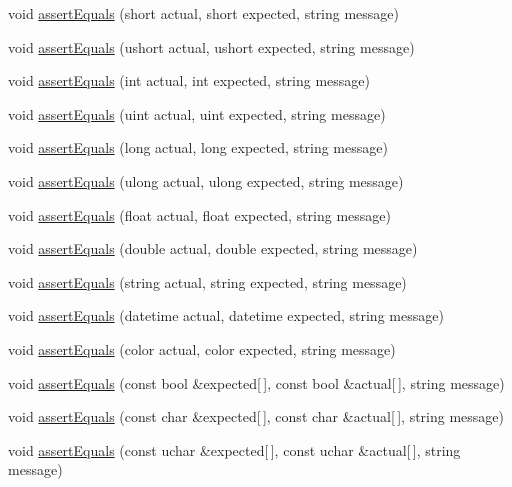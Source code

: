 \begin{DoxyCompactItemize}
void \mbox{\hyperlink{class_unit_test_a005a358493b8c45e8aca3e771fcec9c6}{assert\+Equals}} (short actual, short expected, string message)
\item 
void \mbox{\hyperlink{class_unit_test_aaca7c2c1c646396c291b9d0b66ac6547}{assert\+Equals}} (ushort actual, ushort expected, string message)
\item 
void \mbox{\hyperlink{class_unit_test_a0e871d748e708b0acfdf5cc3a7533517}{assert\+Equals}} (int actual, int expected, string message)
\item 
void \mbox{\hyperlink{class_unit_test_ac2ce73c4eaf229c641de1d282329d611}{assert\+Equals}} (uint actual, uint expected, string message)
\item 
void \mbox{\hyperlink{class_unit_test_a3c0a3687590c54221a78c3f4fec08f4a}{assert\+Equals}} (long actual, long expected, string message)
\item 
void \mbox{\hyperlink{class_unit_test_ae2467005f0522daafb4a800fc6893845}{assert\+Equals}} (ulong actual, ulong expected, string message)
\item 
void \mbox{\hyperlink{class_unit_test_a48c47b2f613072843bef926599978a0e}{assert\+Equals}} (float actual, float expected, string message)
\item 
void \mbox{\hyperlink{class_unit_test_aeea8f3644d850c0a15c9b14da38fc846}{assert\+Equals}} (double actual, double expected, string message)
\item 
void \mbox{\hyperlink{class_unit_test_a28ee30fb3e909e3cf02cff8c0f781ad0}{assert\+Equals}} (string actual, string expected, string message)
\item 
void \mbox{\hyperlink{class_unit_test_a21088b3d491f38b4636280bd9b0b6924}{assert\+Equals}} (datetime actual, datetime expected, string message)
\item 
void \mbox{\hyperlink{class_unit_test_afacce638f6dc7feccafe3ba570d698f2}{assert\+Equals}} (color actual, color expected, string message)
\item 
void \mbox{\hyperlink{class_unit_test_a93caaffb03a038b9bd37c459b537c491}{assert\+Equals}} (const bool \&expected\mbox{[}$\,$\mbox{]}, const bool \&actual\mbox{[}$\,$\mbox{]}, string message)
\item 
void \mbox{\hyperlink{class_unit_test_ab07f01b8cc4bde52c9b1df315c01c43c}{assert\+Equals}} (const char \&expected\mbox{[}$\,$\mbox{]}, const char \&actual\mbox{[}$\,$\mbox{]}, string message)
\item 
void \mbox{\hyperlink{class_unit_test_a170058a3d05888f547ea0912d0fe6756}{assert\+Equals}} (const uchar \&expected\mbox{[}$\,$\mbox{]}, const uchar \&actual\mbox{[}$\,$\mbox{]}, string message)

\end{DoxyCompactItemize}
